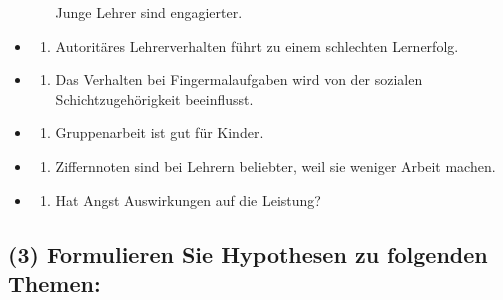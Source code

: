 \documentclass[
]{book}
\providecommand{\tightlist}{%
  \setlength{\itemsep}{0pt}\setlength{\parskip}{0pt}}
\begin{document}
\begin{itemize}
\begin{enumerate}
    Junge Lehrer sind engagierter.
  \end{enumerate}
\item
  \begin{enumerate}
  \def\labelenumi{(\roman{enumi})}
  \tightlist
  \item
    Autoritäres Lehrerverhalten führt zu einem schlechten Lernerfolg.
  \end{enumerate}
\item
  \begin{enumerate}
  \def\labelenumi{\alph{enumi})}
  \setcounter{enumi}{9}
  \tightlist
  \item
    Das Verhalten bei Fingermalaufgaben wird von der sozialen Schichtzugehörigkeit beeinflusst.
  \end{enumerate}
\item
  \begin{enumerate}
  \def\labelenumi{(\alph{enumi})}
  \setcounter{enumi}{10}
  \tightlist
  \item
    Gruppenarbeit ist gut für Kinder.
  \end{enumerate}
\item
  \begin{enumerate}
  \def\labelenumi{(\alph{enumi})}
  \setcounter{enumi}{11}
  \tightlist
  \item
    Ziffernnoten sind bei Lehrern beliebter, weil sie weniger Arbeit machen.
  \end{enumerate}
\item
  \begin{enumerate}
  \def\labelenumi{(\alph{enumi})}
  \setcounter{enumi}{12}
  \tightlist
  \item
    Hat Angst Auswirkungen auf die Leistung?
  \end{enumerate}
\end{itemize}

\hypertarget{formulieren-sie-hypothesen-zu-folgenden-themen}{%
\subsection{(3) Formulieren Sie Hypothesen zu folgenden Themen:}\label{formulieren-sie-hypothesen-zu-folgenden-themen}}
\end{document}
